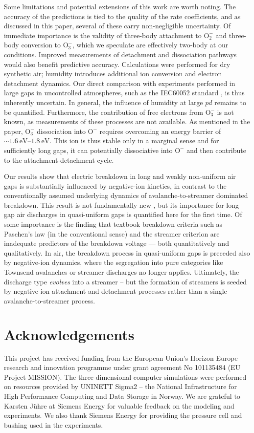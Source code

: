 \documentclass{iopjournal}
\providecommand\Otwom{\ensuremath{\textrm{O}_2^-}}
\providecommand\Othreem{\ensuremath{\textrm{O}_3^-}}
\providecommand\Ominus{\ensuremath{\textrm{O}^-}}
\begin{document}
Some limitations and potential extensions of this work are worth noting.
The accuracy of the predictions is tied to the quality of the rate coefficients, and as discussed in this paper, several of these carry non-negligible uncertainty.
Of immediate importance is the validity of three-body attachment to $\Otwom$ and three-body conversion to $\Othreem$, which we speculate are effectively two-body at our conditions.
Improved measurements of detachment and dissociation pathways would also benefit predictive accuracy.
Calculations were performed for dry synthetic air; humidity introduces additional ion conversion and electron detachment dynamics.
Our direct comparison with experiments performed in large gaps in uncontrolled atmospheres, such as the IEC60052 standard \cite{IEC60052}, is thus inherently uncertain.
In general, the influence of humidity at large $pd$ remains to be quantified.
Furthermore, the contribution of free electrons from $\Othreem$ is not known, as measurements of these processes are not available.
As mentioned in the paper, $\Othreem$ dissociation into $\Ominus$ requires overcoming an energy barrier of $\sim \SIrange{1.6}{1.8}{\electronvolt}$.
This ion is thus stable only in a marginal sense and for sufficiently long gaps, it can potentially dissociative into $\Ominus$ and then contribute to the attachment-detachment cycle.

Our results show that electric breakdown in long and weakly non-uniform air gaps is substantially influenced by negative-ion kinetics, in contrast to the conventionally assumed underlying dynamics of avalanche-to-streamer dominated breakdown.
This result is not fundamentally new \cite{Frommhold1964,Teich1991, Hosl2019}, but its importance for long gap air discharges in quasi-uniform gaps is quantified here for the first time.
Of some importance is the finding that textbook breakdown criteria such as Paschen's law (in the conventional sense) and the streamer criterion are inadequate predictors of the breakdown voltage --- both quantitatively and qualitatively.
In air, the breakdown process in quasi-uniform gaps is preceded also by negative-ion dynamics, where the segregation into pure categories like Townsend avalanches or streamer discharges no longer applies.
Ultimately, the discharge type \emph{evolves} into a streamer -- but the formation of streamers is seeded by negative-ion attachment and detachment processes rather than a single avalanche-to-streamer process.

\section*{Acknowledgements}
This project has received funding from the European Union's Horizon Europe research and innovation programme under grant agreement No 101135484 (EU Project MISSION).
The three-dimensional computer simulations were performed on resources provided by UNINETT Sigma2 -- the National Infrastructure for High Performance Computing and Data Storage in Norway.
We are grateful to Karsten J\"{u}hre at Siemens Energy for valuable feedback on the modeling and experiments.
We also thank Siemens Energy for providing the pressure cell and bushing used in the experiments.
\end{document}
